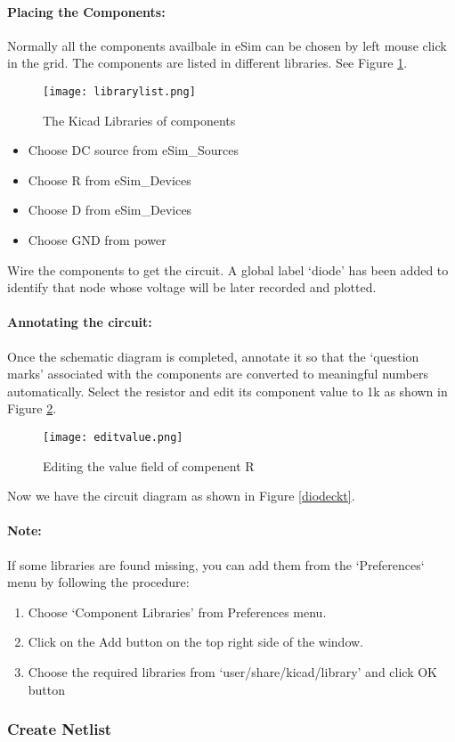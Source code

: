 \paragraph{Placing the Components:} Normally all the components availbale in eSim can be chosen by left mouse click in the grid. The components are listed in different libraries. See Figure \ref{librarylist}.

\begin{figure}[h]
\centering
\texttt{[image: librarylist.png]}
\caption{The Kicad Libraries of components}
\label{librarylist}
\end{figure}

\begin{itemize}
\item
Choose DC source from eSim\_Sources
\item
Choose R from eSim\_Devices
\item
Choose D from eSim\_Devices
\item
Choose GND from power
\end{itemize}

Wire the components to get the circuit. A global label `diode' has been added to identify that node whose voltage will be later recorded and plotted.

\paragraph{Annotating the circuit:} Once the schematic diagram is completed, annotate it so that the `question marks' associated with the components are converted to meaningful numbers automatically. 
Select the resistor and edit its component value to 1k as shown in Figure \ref{editvalue}.

\begin{figure}[h]
\centering
\texttt{[image: editvalue.png]}
\caption{Editing the value field of compenent R}
\label{editvalue}
\end{figure}

 Now we have the circuit diagram as shown in Figure \ref{diodeckt}.


\paragraph{Note:} If some libraries are found missing, you can add them from the `Preferences` menu by following the procedure: 

\begin{enumerate}
\item
Choose `Component Libraries' from Preferences menu.

\item
Click on the Add button on the top right side of the window.

\item
Choose the required libraries from `user/share/kicad/library' and click OK button

\end{enumerate}

\subsubsection{Create Netlist}



